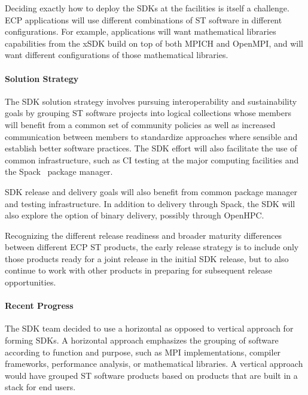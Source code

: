 Deciding exactly how to deploy the SDKs at the facilities is itself a challenge. ECP applications will use different combinations of ST software in different configurations. For example, applications will want mathematical libraries capabilities from the xSDK build on top of both MPICH and OpenMPI, and will want different configurations of those mathematical libraries.

\paragraph{Solution Strategy}
The SDK solution strategy involves pursuing interoperability and sustainability goals by grouping ST software projects into logical collections whose members will benefit from a common set of community policies as well as increased communication between members to standardize approaches where sensible and establish better software practices. The SDK effort will also facilitate the use of common infrastructure, such as CI testing at the major computing facilities and the Spack~\cite{gamblin+:sc15} package manager.

SDK release and delivery goals will also benefit from common package manager and testing infrastructure. In addition to delivery through Spack, the SDK will also explore the option of binary delivery, possibly through OpenHPC.

Recognizing the different release readiness and broader maturity differences between different ECP ST products, the early release strategy is to include only those products ready for a joint release in the initial SDK release, but to also continue to work with other products in preparing for subsequent release opportunities.

\paragraph{Recent Progress}
The SDK team decided to use a horizontal as opposed to vertical approach for forming SDKs. A horizontal approach emphasizes the grouping of software according to function and purpose, such as MPI implementations, compiler frameworks, performance analysis, or mathematical libraries. A vertical approach would have grouped ST software products based on products that are built in a stack for end users. 

